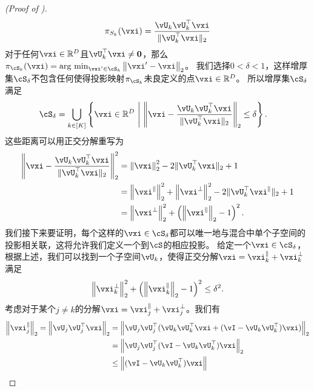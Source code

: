 \documentclass[../../book-main_zh.tex]{subfiles}
\begin{document}
\begin{proof}[(Proof of )]
    \begin{equation}
        \pi_{S_k}(\vxi) = \frac{\vU_k\vU_k^\top \vxi}{\norm{\vU_k^\top \vxi}_2}
    \end{equation}
    对于任何$\vxi \in \R^D$且$\vU_k^\top \vxi \neq \mathbf{0}$，那么$\pi_{\cS_k}(\vxi) = \argmin_{\vxi' \in \cS_k}\norm*{\vxi' - \vxi}_2$。
    我们选择$0 < \delta < 1$，这样增厚集$\cS_{\delta}$不包含任何使得投影映射$\pi_{\cS_k}$未良定义的点$\vxi \in \R^D$。
    所以增厚集$\cS_{\delta}$满足
    \begin{align}
        \cS_{\delta} 
        &= \bigcup_{k \in [K]} \set*{\vxi \in \R^D \given 
        \norm*{\vxi - \frac{\vU_k\vU_k^\top \vxi}{\norm{\vU_k^\top \vxi}_2}}_2
        \leq \delta}.
    \end{align}
    这些距离可以用正交分解重写为
    \begin{align}
        \norm*{\vxi - \frac{\vU_k\vU_k^\top \vxi}{\norm{\vU_k^\top \vxi}_2}}_2^2
        &=
        \norm*{\vxi}_2^2 - 2 \norm{\vU_k^\top \vxi}_2 + 1
        \\
        &=
        \norm*{\vxi^{\|}}_2^2 
        + \norm*{\vxi^{\perp}}_2^2
        - 2 \norm{\vU_k^\top \vxi^{\|}}_2 + 1
        \\
        &=
        \norm*{\vxi^{\perp}}_2^2
        + \left( \norm*{\vxi^{\|}}_2 - 1 \right)^2.
        \label{eq:distance-to-hypersphere}
    \end{align}
    我们接下来要证明，每个这样的$\vxi \in \cS_{\delta}$都可以唯一地与混合中单个子空间的投影相关联，这将允许我们定义一个到$\cS$的相应投影。
    给定一个$\vxi \in \cS_{\delta}$，根据上述，我们可以找到一个子空间$\vU_k$，使得正交分解$\vxi = \vxi^{\|}_k + \vxi^{\perp}_k$满足
    \begin{equation}
        \norm*{\vxi^{\perp}_k}_2^2
        + \left( \norm*{\vxi^{\|}_k}_2 - 1 \right)^2
        \leq
        \delta^2.
    \end{equation}
    考虑对于某个$j \neq k$的分解$\vxi = \vxi_j^{\|} + \vxi_j^{\perp}$。我们有
    \begin{align}
        \norm*{\vxi_j^{\|}}_2
        =
        \norm*{
            \vU_j \vU_j^\top \vxi 
        }_2
        &=
        \norm*{
            \vU_j \vU_j^\top( \vU_k \vU_k^\top \vxi + (\vI - \vU_k \vU_k^\top)
            \vxi )
        }_2
        \\
        &=
        \norm*{
            \vU_j \vU_j^\top (\vI - \vU_k \vU_k^\top) \vxi
        }_2
        \\
        &\leq
        \norm*{
            (\vI - \vU_k \vU_k^\top) \vxi
}
\end{align}
\end{proof}
\end{document}
